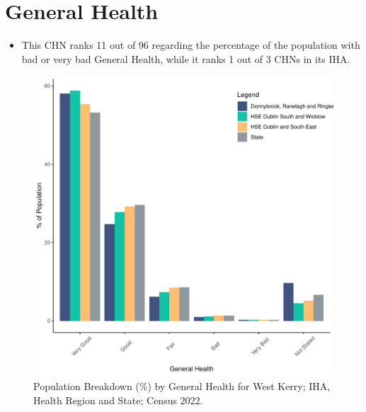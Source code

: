 \documentclass{article}
\begin{document}
\pagebreak

\section{General Health}\label{sect:GenHealth}
\begin{itemize}
\item  This CHN ranks  11 out of 96 regarding the percentage of the population with bad or very bad General Health, while it ranks   1 out of 3 CHNs in its IHA.
\end{itemize}
\begin{figure}[h]
	\centering
	\includegraphics[width = 150mm]{../figures/GenED.pdf}
	\caption{Population Breakdown (\%) by General Health for West Kerry; IHA, Health Region and State;  Census 2022.}
	\label{fig:2ae19629-1a6a-13a3-e055-000000000001}
	\end{figure}
\end{document}
